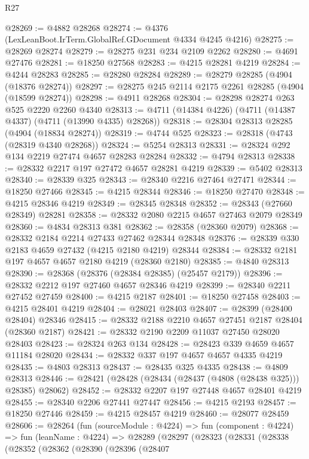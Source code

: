\begin{lexlean}{R27}
\begin{coremodule}
@28269 := @4882 @28268
@28274 := @4376 (LexLeanBoot.IrTerm.GlobalRef.GDocument @4334 @4245 @4216)
@28275 := @28269 @28274
@28279 := @28275 @231 @234 @2109 @2262
@28280 := @4691 @27476
@28281 := @18250 @27568
@28283 := @4215 @28281 @4219
@28284 := @4244 @28283
@28285 := @28280 @28284
@28289 := @28279 @28285 (@4904 (@18376 @28274))
@28297 := @28275 @245 @2114 @2175 @2261 @28285 (@4904 (@18599 @28274))
@28298 := @4911 @28268
@28304 := @28298 @28274 @263 @525 @2220 @2260 @4340
@28313 := @4711 (@14384 @4226) (@4711 (@14387 @4337) (@4711 (@13990 @4335) @28268))
@28318 := @28304 @28313 @28285 (@4904 (@18834 @28274))
@28319 := @4744 @525
@28323 := @28318 (@4743 (@28319 @4340 @28268))
@28324 := @5254 @28313
@28331 := @28324 @292 @134 @2219 @27474 @4657 @28283 @28284
@28332 := @4794 @28313
@28338 := @28332 @2217 @197 @27472 @4657 @28281 @4219
@28339 := @5402 @28313
@28340 := @28339 @325
@28343 := @28340 @2216 @27464 @27471
@28344 := @18250 @27466
@28345 := @4215 @28344
@28346 := @18250 @27470
@28348 := @4215 @28346 @4219
@28349 := @28345 @28348
@28352 := @28343 (@27660 @28349) @28281
@28358 := @28332 @2080 @2215 @4657 @27463 @2079 @28349
@28360 := @4834 @28313 @381
@28362 := @28358 (@28360 @2079)
@28368 := @28332 @2184 @2214 @27433 @27462 @28344 @28348
@28376 := @28339 @330 @2183 @4659 @27432 (@4215 @2180 @4219) @28344
@28384 := @28332 @2181 @197 @4657 @4657 @2180 @4219 (@28360 @2180)
@28385 := @4840 @28313
@28390 := @28368 (@28376 (@28384 @28385) (@25457 @2179))
@28396 := @28332 @2212 @197 @27460 @4657 @28346 @4219
@28399 := @28340 @2211 @27452 @27459
@28400 := @4215 @2187
@28401 := @18250 @27458
@28403 := @4215 @28401 @4219
@28404 := @28021 @28403
@28407 := @28399 (@28400 @28404) @28346
@28415 := @28332 @2188 @2210 @4657 @27451 @2187 @28404 (@28360 @2187)
@28421 := @28332 @2190 @2209 @11037 @27450 @28020 @28403
@28423 := @28324 @263 @134
@28428 := @28423 @339 @4659 @4657 @11184 @28020
@28434 := @28332 @337 @197 @4657 @4657 @4335 @4219
@28435 := @4803 @28313
@28437 := @28435 @325 @4335
@28438 := @4809 @28313
@28446 := @28421 (@28428 (@28434 (@28437 (@4808 (@28438 @325))) @28385) @28062)
@28452 := @28332 @2207 @197 @27448 @4657 @28401 @4219
@28455 := @28340 @2206 @27441 @27447
@28456 := @4215 @2193
@28457 := @18250 @27446
@28459 := @4215 @28457 @4219
@28460 := @28077 @28459
@28606 := @28264
    (fun (sourceModule : @4224) =>
    fun (component : @4224) =>
    fun (leanName : @4224) =>
    @28289
      (@28297
        (@28323
          (@28331
            (@28338
              (@28352
                (@28362
                  (@28390
                    (@28396
                      (@28407

\end{coremodule}
\end{lexlean}
